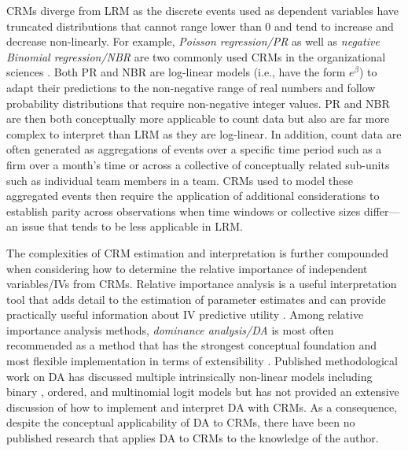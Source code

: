 \documentclass[ShortAfour,times,sageapa]{sagej}
\begin{document}
	CRMs diverge from LRM as the discrete events used as dependent variables have truncated distributions that cannot range lower than 0 and tend to increase and decrease non-linearly.  
	For example, \textit{Poisson regression/PR} as well as \textit{negative Binomial regression/NBR} are two commonly used CRMs in the organizational sciences \cite{}. 
	Both PR and NBR are log-linear models (i.e., have the form $e^{\beta}$) to adapt their predictions to the non-negative range of real numbers and follow probability distributions that require non-negative integer values. %
	PR and NBR are then both conceptually more applicable to count data but also are far more complex to interpret than LRM as they are log-linear.
	In addition, count data are often generated as aggregations of events over a specific time period such as a firm over a month's time or across a collective of conceptually related sub-units such as individual team members in a team.
	CRMs used to model these aggregated events then require the application of additional considerations to establish parity across observations when time windows or collective sizes differ---an issue that tends to be less applicable in LRM.
	
	The complexities of CRM estimation and interpretation is further compounded when considering how to determine the relative importance of independent variables/IVs from CRMs.
	Relative importance analysis is a useful interpretation tool that adds detail to the estimation of parameter estimates \cite{tonidandel2011relative} and can provide practically useful information about IV predictive utility \cite{}.  
	Among relative importance analysis methods, \textit{dominance analysis/DA} \cite{} is most often recommended as a method that has the strongest conceptual foundation \cite{} and most flexible implementation in terms of extensibility \cite{luchman2021determining}.
	Published methodological work on DA has discussed multiple intrinsically non-linear models including binary \cite{azen2009using}, ordered, and multinomial logit \cite{luchman2014relative} models but has not provided an extensive discussion of how to implement and interpret DA with CRMs. 
	As a consequence, despite the conceptual applicability of DA to CRMs, there have been no published research that applies DA to CRMs to the knowledge of the author.
	
	
\end{document}
